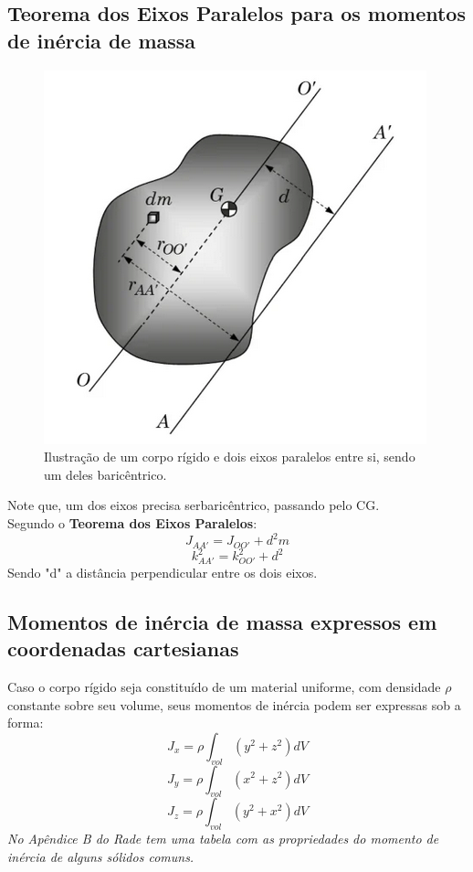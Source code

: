 \documentclass[a4paper, 12pt]{article}
\begin{document}
	\subsection{Teorema dos Eixos Paralelos para os momentos de inércia de massa}
		\begin{figure}[h]
			\center
			\includegraphics[scale=0.5]{imagens/a2.png} 
			\caption{Ilustração de um corpo rígido e dois eixos paralelos entre si, sendo um deles baricêntrico.}
		\end{figure}	
		Note que, um dos eixos precisa serbaricêntrico, passando pelo CG.\\
		
		Segundo o \textbf{Teorema dos Eixos Paralelos}:
			\begin{equation}
				J_{AA'} = J_{OO'} + d^2m
			\end{equation}
			\begin{equation}
				k^2_{AA'} = k^2_{OO'} + d^2
			\end{equation}
		Sendo "d" a distância perpendicular entre os dois eixos. 

	\subsection{Momentos de inércia de massa expressos em coordenadas cartesianas}
		Caso o corpo rígido seja constituído de um material uniforme, com densidade $\rho$ constante sobre seu volume, seus momentos de inércia podem ser expressas sob a forma:
		\begin{equation}
			J_x = \rho \int_{vol}(y^2 + z^2)dV
		\end{equation}
		\begin{equation}
			J_y = \rho \int_{vol}(x^2 + z^2)dV
		\end{equation}
		\begin{equation}
			J_z = \rho \int_{vol}(y^2 + x^2)dV
		\end{equation}
		\textit{No Apêndice B do Rade tem uma tabela com as propriedades do momento de inércia de alguns sólidos comuns.}
		
\end{document}
